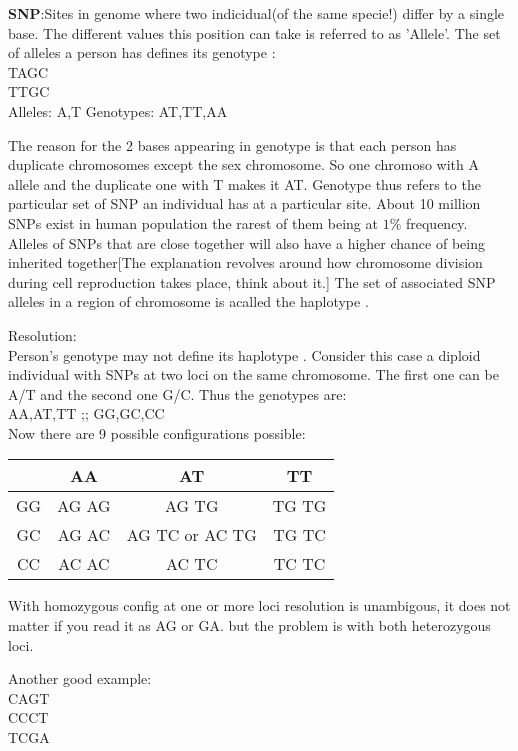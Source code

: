 \documentclass[a4paper]{article}
\begin{document}
\textbf{SNP}:Sites in genome where two indicidual(of the same specie!)  differ by a single base. The different values this position can take is referred to as 'Allele'. The set of alleles 
a person has defines its genotype : \\
T{\color{red}A}GC \\
T{\color{red}T}GC \\

Alleles: A,T
Genotypes: AT,TT,AA

The reason for the 2 bases appearing in genotype is that each person has duplicate chromosomes except the sex chromosome. So one chromoso with A allele and the duplicate one with T makes 
it AT. Genotype thus refers to the particular set of SNP an individual has at a particular site.  About 10 million SNPs exist in human population the rarest of them being at $1\% $ frequency. Alleles
of SNPs that are close together will also have a higher chance of being inherited together[The explanation revolves around how chromosome division during cell reproduction takes place, think about it.]
The set of associated SNP alleles in  a region of chromosome is acalled the haplotype . 

Resolution:\\
Person's genotype may not define its  haplotype . Consider this case a diploid individual with SNPs at two loci on the same chromosome. The  first one can be A/T and the second one
G/C. Thus the genotypes are: \\
AA,AT,TT ;; GG,GC,CC \\

Now there are 9 possible configurations possible:\\
\begin{tabular}{c|c|c|c}
 \hline
	   &  AA   &       AT       &  TT   \\
	   \hline
	GG & AG AG &     AG TG      & TG TG \\
	 \hline
	GC & AG AC & AG TC or	AC TG & TG TC \\
	 \hline
	CC & AC AC &     AC TC      & TC TC \\
	 \hline
\end{tabular}

With homozygous config at one or more loci resolution is unambigous, it does not matter if you read it as AG or GA. but the problem is with both heterozygous loci.

Another good example: \\

{\color{red}{A}}CA{\color{green}{T}}GT \\
{\color{red}{A}}CC{\color{green}{G}}CT \\
{\color{red}{G}}TC{\color{green}{G}}GA \\
\end{document}
